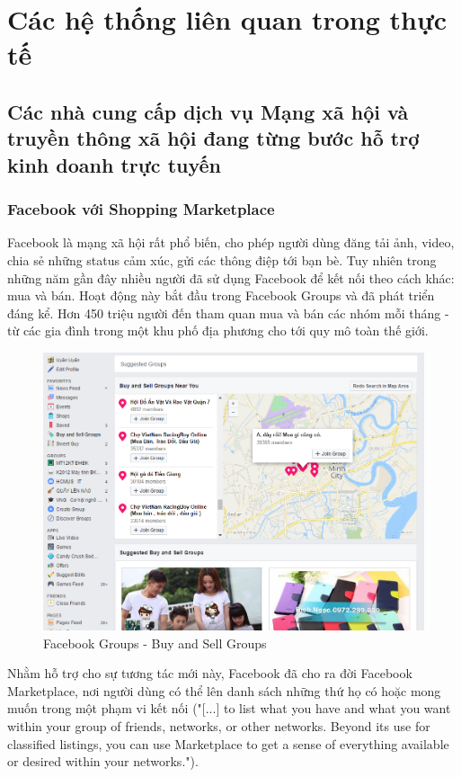 \chapter{Các hệ thống liên quan trong thực tế}

\section{Các nhà cung cấp dịch vụ Mạng xã hội và truyền thông xã hội đang từng bước hỗ trợ kinh doanh trực tuyến}
\subsection{Facebook với Shopping Marketplace}

Facebook là mạng xã hội rất phổ biến, cho phép người dùng đăng tải ảnh, video, chia sẻ những status cảm xúc, gửi các thông điệp tới bạn bè. Tuy nhiên trong những năm gần đây nhiều người đã sử dụng Facebook để kết nối theo cách khác: mua và bán. Hoạt động này bắt đầu trong Facebook Groups và đã phát triển đáng kể. Hơn 450 triệu người đến tham quan mua và bán các nhóm mỗi tháng - từ các gia đình trong một khu phố địa phương cho tới quy mô toàn thế giới.

\begin{figure}[H]
	\centering
	\includegraphics[scale=.5]{img/fb-group-buy.PNG} 
	\caption{Facebook Groups - Buy and Sell Groups}
\end{figure}

Nhằm hỗ trợ cho sự tương tác mới này, Facebook đã cho ra đời Facebook Marketplace, nơi người dùng có thể lên danh sách những thứ họ có hoặc mong muốn trong một phạm vi kết nối ("[...] to list what you have and what you want within your group of friends, networks, or other networks. Beyond its use for classified listings, you can use Marketplace to get a sense of everything available or desired within your networks."\cite{facebooknote1}).

